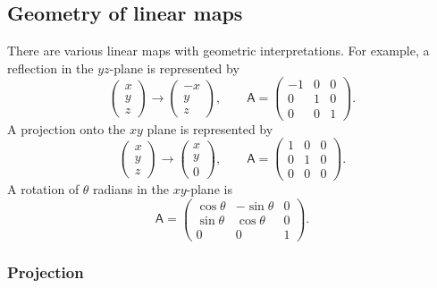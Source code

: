 \documentclass[10pt,notitlepage]{revtex4-1}
\begin{document}

\subsection{Geometry of linear maps}

There are various linear maps with geometric interpretations. For example, a
reflection in the $yz$-plane is represented by
\begin{equation}
	\begin{pmatrix}x\\y\\z\end{pmatrix}\rightarrow
	\begin{pmatrix}-x\\y\\z\end{pmatrix},\qquad
	\mathsf{A}=\begin{pmatrix}-1&0&0\\0&1&0\\0&0&1\end{pmatrix}.
\end{equation}
A projection onto the $xy$ plane is represented by
\begin{equation}
	\begin{pmatrix}x\\y\\z\end{pmatrix}\rightarrow
	\begin{pmatrix}x\\y\\0\end{pmatrix},\qquad
	\mathsf{A}=\begin{pmatrix}1&0&0\\0&1&0\\0&0&0\end{pmatrix}.
\end{equation}
A rotation of $\theta$ radians in the $xy$-plane is
\begin{equation}
	\mathsf{A}=\begin{pmatrix}\cos\theta&-\sin\theta&0\\
	\sin\theta&\cos\theta&0\\0&0&1\end{pmatrix}.
\end{equation}

\subsubsection{Projection}
\end{document}
